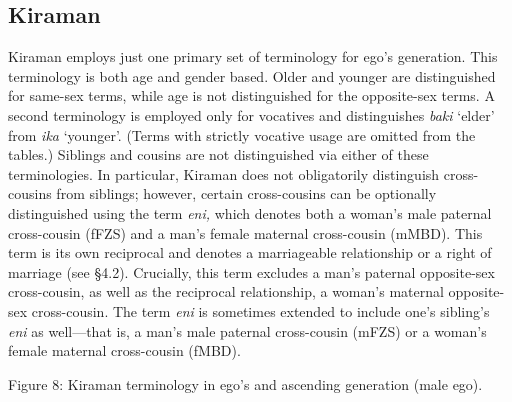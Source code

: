 \subsection[Kiraman]{Kiraman}
\hypertarget{RefHeading78023871885726}{}Kiraman employs just one primary set of terminology for ego{\textquoteright}s generation. This terminology is both age and gender based. Older and younger are distinguished for same-sex terms, while age is not distinguished for the opposite-sex terms. A second terminology is employed only for vocatives and distinguishes \textit{baki }{\textquoteleft}elder{\textquoteright} from \textit{ika }{\textquoteleft}younger{\textquoteright}. (Terms with strictly vocative usage are omitted from the tables.) Siblings and cousins are not distinguished via either of these terminologies. In particular, Kiraman does not obligatorily distinguish cross-cousins from siblings; however, certain cross-cousins can be optionally distinguished using the term \textit{eni, }which denotes both a woman{\textquoteright}s male paternal cross-cousin (fFZS) and a man{\textquoteright}s female maternal cross-cousin (mMBD). This term is its own reciprocal and denotes a marriageable relationship or a right 
of marriage (see {\S}4.2). Crucially, this term excludes a man{\textquoteright}s paternal opposite-sex cross-cousin, as well as the reciprocal relationship, a woman{\textquoteright}s maternal opposite-sex cross-cousin. The term\textit{ eni }is sometimes extended to include one{\textquoteright}s sibling{\textquoteright}s \textit{eni} as well---that is, a man{\textquoteright}s male paternal cross-cousin (mFZS) or a woman{\textquoteright}s female maternal cross-cousin (fMBD). 

{\centering
Figure 8: Kiraman terminology in ego{\textquoteright}s and ascending generation (male ego).
\par}

{%
 \par}

